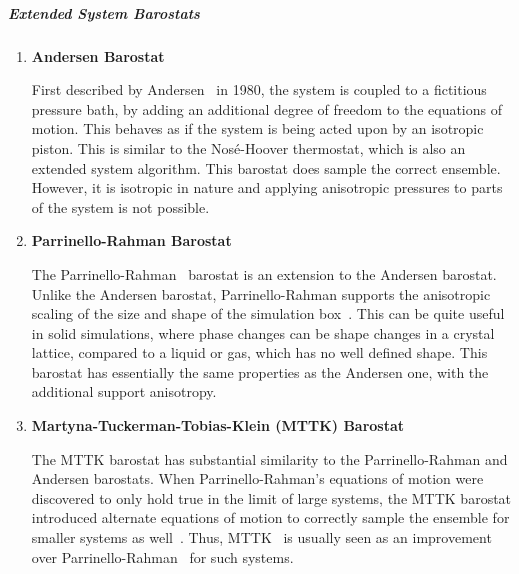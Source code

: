 \documentclass[9pt,bestpractices]{livecoms}
\begin{document}
\subparagraph{Extended System Barostats}
\begin{enumerate}[listparindent=\parindent]
\item \textbf{Andersen Barostat}

First described by Andersen~\cite{andersen1980molecular} in 1980, the system is coupled to a fictitious pressure bath, by adding an additional degree of freedom to the equations of motion.
This behaves as if the system is being acted upon by an isotropic piston.
This is similar to the Nos\'{e}-Hoover thermostat, which is also an extended system algorithm.
This barostat does sample the correct ensemble. However, it is isotropic in nature and applying anisotropic pressures to parts of the system is not possible.

\item \textbf{Parrinello-Rahman Barostat}

The Parrinello-Rahman~\cite{Parrinello1981} barostat is an extension to the Andersen barostat.
Unlike the Andersen barostat, Parrinello-Rahman supports the anisotropic scaling of the size and shape of the simulation box~\cite{Parrinello1981}.
This can be quite useful in solid simulations, where phase changes can be shape changes in a crystal lattice, compared to a liquid or gas, which has no well defined shape.
This barostat has essentially the same properties as the Andersen one, with the additional support anisotropy.

\item \textbf{Martyna-Tuckerman-Tobias-Klein (MTTK) Barostat}

The MTTK barostat has substantial similarity to the Parrinello-Rahman and Andersen barostats.
When Parrinello-Rahman's equations of motion were discovered to only hold true in the limit of large systems, the MTTK barostat introduced alternate equations of motion to correctly sample the ensemble for smaller systems as well~\cite{martyna1994constant, martyna1996explicit}.
Thus, MTTK~\cite{martyna1994constant, martyna1996explicit} is usually seen as an improvement over Parrinello-Rahman~\cite{Parrinello1981} for such systems.

\end{enumerate}
\end{document}
